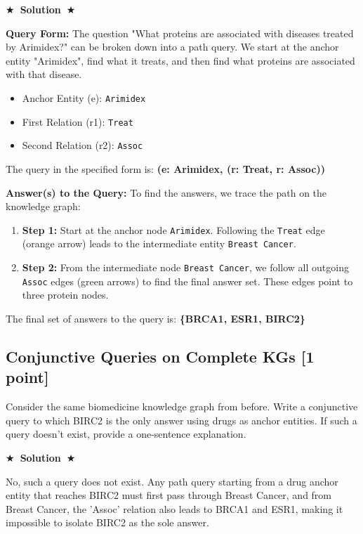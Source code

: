 \documentclass{article}
\numberwithin{figure}{section}
\newcommand{\Solution}[1]{%
    {%
        \medskip
        \color{red}
        \bf $\bigstar$~\sf\textbf{Solution}~$\bigstar$ \sf
        #1
    }
    \bigskip
}
\begin{document}
\Solution{
	\textbf{Query Form:}
	The question "What proteins are associated with diseases treated by Arimidex?" can be broken down into a path query. We start at the anchor entity "Arimidex", find what it treats, and then find what proteins are associated with that disease.
	
	\begin{itemize}
		\item Anchor Entity (e): \texttt{Arimidex}
		\item First Relation (r1): \texttt{Treat}
		\item Second Relation (r2): \texttt{Assoc}
	\end{itemize}
	
	The query in the specified form is: \textbf{(e: Arimidex, (r: Treat, r: Assoc))}
	
	\textbf{Answer(s) to the Query:}
	To find the answers, we trace the path on the knowledge graph:
	\begin{enumerate}
		\item \textbf{Step 1:} Start at the anchor node \texttt{Arimidex}. Following the \texttt{Treat} edge (orange arrow) leads to the intermediate entity \texttt{Breast Cancer}.
		\item \textbf{Step 2:} From the intermediate node \texttt{Breast Cancer}, we follow all outgoing \texttt{Assoc} edges (green arrows) to find the final answer set. These edges point to three protein nodes.
	\end{enumerate}
	
	The final set of answers to the query is: \textbf{\{BRCA1, ESR1, BIRC2\}}
}


\subsection{Conjunctive Queries on Complete KGs [1 point]}
Consider the same biomedicine knowledge graph from before. Write a conjunctive query to which BIRC2 is the only answer using drugs as anchor entities. If such a query doesn't exist, provide a one-sentence explanation.

\Solution{
	No, such a query does not exist. Any path query starting from a drug anchor entity that reaches BIRC2 must first pass through Breast Cancer, and from Breast Cancer, the 'Assoc' relation also leads to BRCA1 and ESR1, making it impossible to isolate BIRC2 as the sole answer.
}
\end{document}
